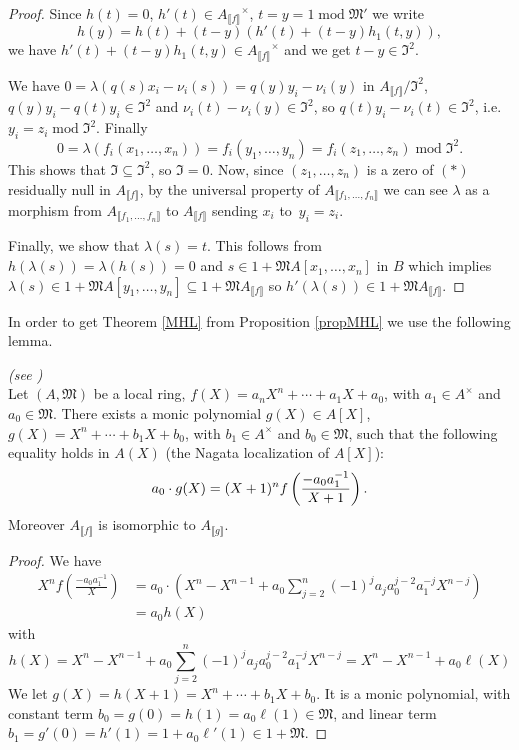 \documentclass[11pt,a4paper,twoside]{article}
\newcommand{\gothic}{\mathfrak}
\newcommand{\fI}{{\gothic I}}
\newcommand{\fM}{{\gothic M}}
\newcommand\lrb[1] {\llbracket #1 \rrbracket}
\newcommand\Af {{A_{\lrb f}}}
\newcommand\Afn {A_{\lrb{f_1,\dots,f_n}}}
\newcommand{\mod}{\;\mathrm{mod}\;}
\begin{document}
\begin{proof}
\noindent 
Since $h(t)=0$, $h'(t)\in\Af^{\times}$, $t=y=1 \mod \fM'$ we write 
$$h(y)=h(t)+(t-y)(h'(t)+ (t-y)h_1(t,y)),$$
 we have  $h'(t)+ (t-y)h_1(t,y)\in\Af^{\times}$  and we get $t-y\in \fI^2$.
 
\noindent We have $0=\lambda(q(s)x_i-\nu_i(s))=q(y)y_i-\nu_i(y)$ in $\Af/\fI^2$,
$q(y)y_i-q(t)y_i\in\fI^2$ and $\nu_i(t)-\nu_i(y)\in\fI^2$, so
$q(t)y_i-\nu_i(t)\in\fI^2$, i.e.\ $y_i=z_i\mod \fI^2$.
Finally 
$$
0=\lambda(f_i(x_1,\dots,x_n))=f_i(y_1,\dots,y_n)=f_i(z_1,\dots,z_n)\mod \fI^2.
$$
This shows that $\fI\subseteq \fI^2$, so $\fI=0$. Now, since $(z_1,\dots,z_n)$
is a zero of $(*)$ residually null in $\Af$, by the universal property of 
$\Afn$ we can see  $\lambda$ 
as a morphism from  $\Afn$ to $\Af$ 
sending $x_i$ \hbox{to $y_i=z_i$}. 

\smallskip \noindent  Finally, we show that $\lambda(s)=t$. This follows from
$h(\lambda(s))=\lambda(h(s))=0$ and $s\in1+\fM A[x_1,\dots,x_n]$ in $B$
which implies $\lambda(s)\in1+\fM A[y_1,\dots,y_n]\subseteq 1+\fM\Af$
so $h'(\lambda(s)) \in 1+\fM\Af$. 
\end{proof}

In order to get Theorem \ref{MHL} from Proposition \ref{propMHL}
we use the following lemma.






\begin{lemma} \label{lemMonicMHL2} \emph{(see \cite[Lemma 5.3]{ALP})}\\
 Let $(A,\fM)$ be a local ring,
  \(f(X)=a_nX^n+\cdots +a_1 X+a_0\), with
\(a_1\in A^\times\) and \(a_0\in\fM\). There exists a monic polynomial
\(g(X)\in A[X]\), \(g(X)=X^n+\cdots+b_1 X+b_0\), with \(b_1\in
A^\times\) and \(b_0\in\fM\), such that the following equality holds in
\(A(X)\) (the Nagata localization of $A[X]$):
%
\[a_0\cdot g(X)=(X+1)^n f\left( {-a_0 a_1^{-1}\over X+1}
\right).\] 
%
Moreover $\Af$ is isomorphic to $A_{\lrb g}$.
\end{lemma}
\begin{proof}
We have 
%
\[\begin{array}{rl}
X^n f\left(\frac{-a_{0}
a_{1}^{-1}}{X}\right) & = a_{0}\cdot \left(X^n-X^{n-1}+a_{0}
\sum_{j=2}^{n}(-1)^j a_{j}a_{0}^{j-2} a_{1}^{-j} 
X^{n-j}\right)\\[2mm]
 & = a_{0} h(X)
\end{array}\]
%
with
%
\[ h(X)= X^n-X^{n-1}+a_{0}
\sum_{j=2}^{n}(-1)^j   a_{j}a_{0}^{j-2} a_{1}^{-j}  X^{n-j}
= X^n-X^{n-1}+a_{0} \ell(X) \]
%
We let \(g(X)=h(X+1)=X^n+\cdots+b_1 X+b_0\). It is a monic polynomial,
with constant term \(b_0=g(0)=h(1)=a_{0} \ell(1)\in\fM\), and linear
term \(b_1=g'(0)=h'(1)=1+a_{0}\ell'(1)\in1+\fM\).
\end{proof}
\end{document}
